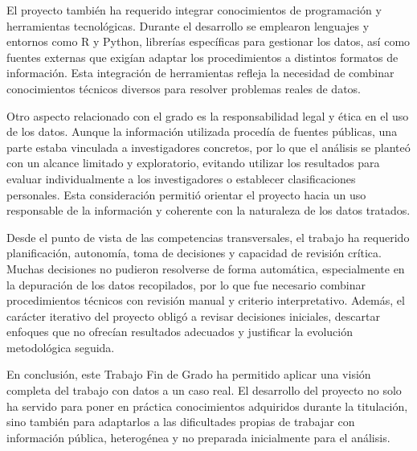 \documentclass[11pt,spanish,listoffigures,listoftables]{tfgetsinf}
\begin{document}
El proyecto también ha requerido integrar conocimientos de programación y herramientas tecnológicas. Durante el desarrollo se emplearon lenguajes y entornos como R y Python, librerías específicas para gestionar los datos, así como fuentes externas que exigían adaptar los procedimientos a distintos formatos de información. Esta integración de herramientas refleja la necesidad de combinar conocimientos técnicos diversos para resolver problemas reales de datos.

Otro aspecto relacionado con el grado es la responsabilidad legal y ética en el uso de los datos. Aunque la información utilizada procedía de fuentes públicas, una parte estaba vinculada a investigadores concretos, por lo que el análisis se planteó con un alcance limitado y exploratorio, evitando utilizar los resultados para evaluar individualmente a los investigadores o establecer clasificaciones personales. Esta consideración permitió orientar el proyecto hacia un uso responsable de la información y coherente con la naturaleza de los datos tratados.

Desde el punto de vista de las competencias transversales, el trabajo ha requerido planificación, autonomía, toma de decisiones y capacidad de revisión crítica. Muchas decisiones no pudieron resolverse de forma automática, especialmente en la depuración de los datos recopilados, por lo que fue necesario combinar procedimientos técnicos con revisión manual y criterio interpretativo. Además, el carácter iterativo del proyecto obligó a revisar decisiones iniciales, descartar enfoques que no ofrecían resultados adecuados y justificar la evolución metodológica seguida.

En conclusión, este Trabajo Fin de Grado ha permitido aplicar una visión completa del trabajo con datos a un caso real. El desarrollo del proyecto no solo ha servido para poner en práctica conocimientos adquiridos durante la titulación, sino también para adaptarlos a las dificultades propias de trabajar con información pública, heterogénea y no preparada inicialmente para el análisis.

\end{document}
